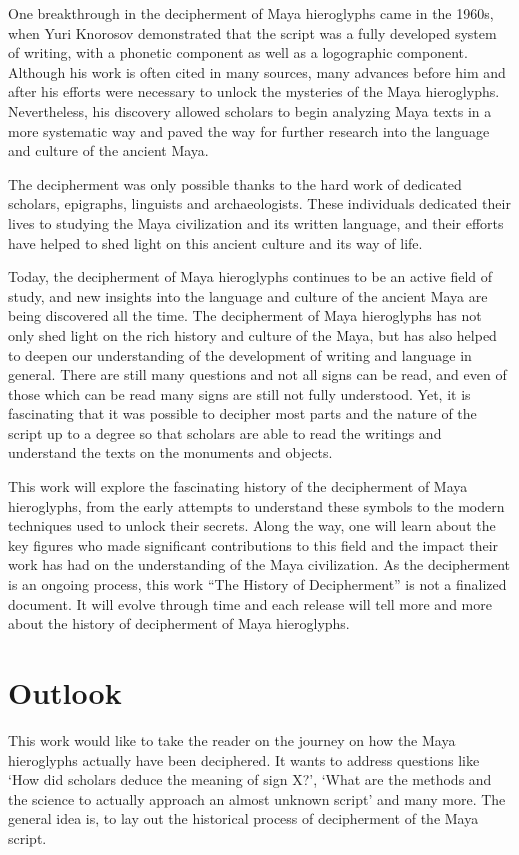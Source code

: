 \documentclass[../main.tex]{subfiles}
\begin{document}
One breakthrough in the decipherment of Maya hieroglyphs came in the 1960s, 
when Yuri Knorosov demonstrated that the script was a fully developed system of writing, 
with a phonetic component as well as a logographic component. 
Although his work is often cited in many sources, many advances before him and after his efforts
were necessary to unlock the mysteries of the Maya hieroglyphs.
Nevertheless, his discovery allowed scholars to begin analyzing Maya texts in a more systematic 
way and paved the way for further research into the language and culture of the ancient Maya.

The decipherment was only possible thanks to the hard work of dedicated scholars, epigraphs, 
linguists and archaeologists. 
These individuals dedicated their lives to studying the Maya civilization and its written 
language, and their efforts have helped to shed light on this ancient culture and its way of life. 

Today, the decipherment of Maya hieroglyphs continues to be an active field of study, 
and new insights into the language and culture of the ancient Maya are being discovered 
all the time. 
The decipherment of Maya hieroglyphs has not only shed light on the rich history and culture of 
the Maya, but has also helped to deepen our understanding of the development of writing and 
language in general.
There are still many questions and not all signs can be read, and even of those which can be read
many signs are still not fully understood.
Yet, it is fascinating that it was possible to decipher most parts
and the nature of the script up to a degree so that scholars are able to read the writings and 
understand the texts on the monuments and objects.

This work will explore the fascinating history of the decipherment of Maya hieroglyphs, 
from the early attempts to understand these symbols to the modern techniques used to unlock 
their secrets. Along the way, one will learn about the key figures who made significant 
contributions to this field and the impact their work has had on the understanding of the 
Maya civilization.
As the decipherment is an ongoing process, this work ``The History of Decipherment'' is not a 
finalized document.
It will evolve through time and each release will tell more and more 
about the history of decipherment of Maya hieroglyphs.

\section{Outlook}
This work would like to take the reader on the journey on how the Maya hieroglyphs actually 
have been deciphered.
It wants to address questions like `How did scholars deduce the meaning of sign X?',
`What are the methods and the science to actually approach an almost unknown script' and many more.
The general idea is, to lay out the historical process of decipherment of the Maya script.
\end{document}
